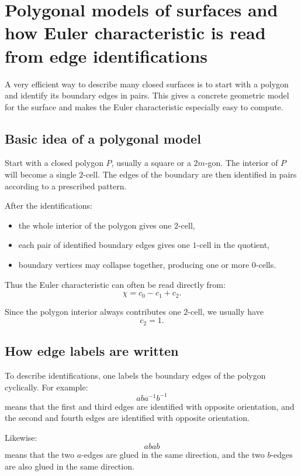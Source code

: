 \documentclass[12pt,a4paper]{article}
\theoremstyle{notespace}
\begin{document}
\section{Polygonal models of surfaces and how Euler characteristic is read from edge identifications}

A very efficient way to describe many closed surfaces is to start with a polygon and identify its boundary edges in pairs. This gives a concrete geometric model for the surface and makes the Euler characteristic especially easy to compute.

\subsection{Basic idea of a polygonal model}

Start with a closed polygon \(P\), usually a square or a \(2m\)-gon. The interior of \(P\) will become a single \(2\)-cell. The edges of the boundary are then identified in pairs according to a prescribed pattern.

After the identifications:
\begin{itemize}
	\item the whole interior of the polygon gives one \(2\)-cell,
	\item each pair of identified boundary edges gives one \(1\)-cell in the quotient,
	\item boundary vertices may collapse together, producing one or more \(0\)-cells.
\end{itemize}

Thus the Euler characteristic can often be read directly from:
\[
\chi = c_0-c_1+c_2.
\]

Since the polygon interior always contributes one \(2\)-cell, we usually have
\[
c_2=1.
\]

\subsection{How edge labels are written}

To describe identifications, one labels the boundary edges of the polygon cyclically. For example:
\[
aba^{-1}b^{-1}
\]
means that the first and third edges are identified with opposite orientation, and the second and fourth edges are identified with opposite orientation.

Likewise:
\[
aba b
\]
means that the two \(a\)-edges are glued in the same direction, and the two \(b\)-edges are also glued in the same direction.
\end{document}
